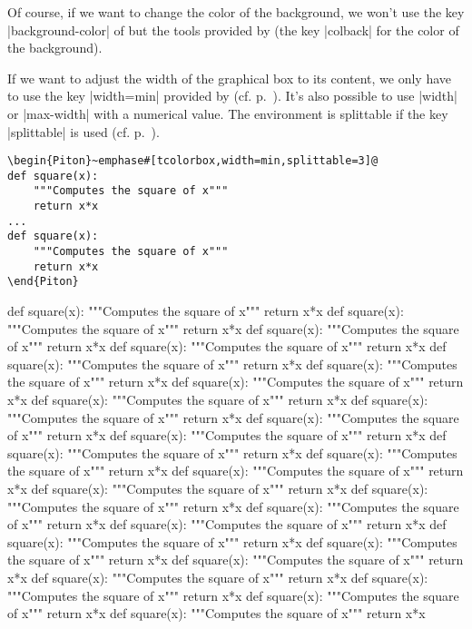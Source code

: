 \documentclass{article}
\begin{document}
Of course, if we want to change the color of the background, we won't use the key
|background-color| of  but the tools provided by 
(the key |colback| for the color of the background).

\bigskip
If we want to adjust the width of the graphical box to its content, we only
have to use the key |width=min| provided by  (cf.
p.~\pageref{width}). It's also possible to use |width| or |max-width| with a
numerical value. The environment is splittable if the key |splittable| is used (cf.
p.~\pageref{page breaks}).

\begin{Verbatim}
\begin{Piton}~emphase#[tcolorbox,width=min,splittable=3]@
def square(x):
    """Computes the square of x"""
    return x*x
...
def square(x):
    """Computes the square of x"""
    return x*x
\end{Piton}
\end{Verbatim}

\begin{Piton}[tcolorbox,width=min,splittable=3]
def square(x):
    """Computes the square of x"""
    return x*x
def square(x):
    """Computes the square of x"""
    return x*x
def square(x):
    """Computes the square of x"""
    return x*x
def square(x):
    """Computes the square of x"""
    return x*x
def square(x):
    """Computes the square of x"""
    return x*x
def square(x):
    """Computes the square of x"""
    return x*x
def square(x):
    """Computes the square of x"""
    return x*x
def square(x):
    """Computes the square of x"""
    return x*x
def square(x):
    """Computes the square of x"""
    return x*x
def square(x):
    """Computes the square of x"""
    return x*x
def square(x):
    """Computes the square of x"""
    return x*x
def square(x):
    """Computes the square of x"""
    return x*x
def square(x):
    """Computes the square of x"""
    return x*x
def square(x):
    """Computes the square of x"""
    return x*x
def square(x):
    """Computes the square of x"""
    return x*x
def square(x):
    """Computes the square of x"""
    return x*x
def square(x):
    """Computes the square of x"""
    return x*x
def square(x):
    """Computes the square of x"""
    return x*x
def square(x):
    """Computes the square of x"""
    return x*x
def square(x):
    """Computes the square of x"""
    return x*x
def square(x):
    """Computes the square of x"""
    return x*x
def square(x):
    """Computes the square of x"""
    return x*x
def square(x):
    """Computes the square of x"""
    return x*x
def square(x):
    """Computes the square of x"""
    return x*x
def square(x):
    """Computes the square of x"""
    return x*x
\end{Piton}
\end{document}
